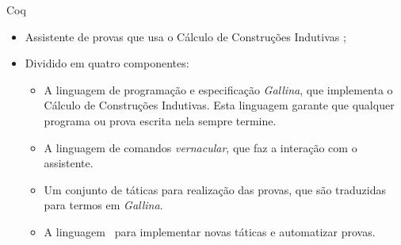 \begin{frame}{Coq}
    \begin{itemize}
        \item Assistente de provas que usa o Cálculo de Construções Indutivas \cite{bertot2013interactive};
        \item Dividido em quatro componentes:
        \begin{itemize}
            \item A linguagem de programação e especificação \textit{Gallina}, que implementa o Cálculo de Construções Indutivas.
                  Esta linguagem garante que qualquer programa ou prova escrita nela sempre termine.
            \item A linguagem de comandos \textit{vernacular}, que faz a interação com o assistente.
            \item Um conjunto de táticas para realização das provas, que são traduzidas para termos em \textit{Gallina}.
            \item A linguagem \Ltac\ para implementar novas táticas e automatizar provas.
        \end{itemize}
    \end{itemize}
\end{frame}